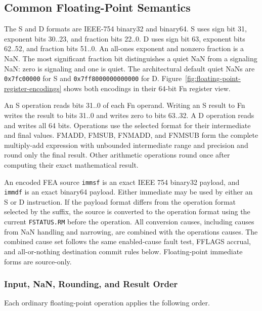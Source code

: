 \subsection{Common Floating-Point Semantics}

The S and D formats are IEEE-754 binary32 and binary64. S uses sign bit 31, exponent bits 30..23, and fraction bits
22..0. D uses sign bit 63, exponent bits 62..52, and fraction bits 51..0. An all-ones exponent and nonzero fraction
is a NaN. The most significant fraction bit distinguishes a quiet NaN from a signaling NaN: zero is signaling and
one is quiet. The architectural default quiet NaNs are \texttt{0x7fc00000} for S and
\texttt{0x7ff8000000000000} for D. Figure~\ref{fig:floating-point-register-encodings} shows both encodings in their
64-bit Fn register view.

An S operation reads bits 31..0 of each Fn operand. Writing an S result to Fn writes the result to bits 31..0 and
writes zero to bits 63..32. A D operation reads and writes all 64 bits. Operations use the selected format for their
intermediate and final values. FMADD, FMSUB, FNMADD, and FNMSUB form the complete multiply-add expression with
unbounded intermediate range and precision and round only the final result. Other arithmetic operations round once
after computing their exact mathematical result.

An encoded FEA source \texttt{immsf} is an exact IEEE 754 binary32 payload, and \texttt{immdf} is an exact
binary64 payload. Either immediate may be used by either an S or D instruction. If the payload format differs from
the operation format selected by the suffix, the source is converted to the operation format using the current
\texttt{FSTATUS.RM} before the operation. All conversion causes, including causes from NaN handling and narrowing,
are combined with the operation\textquotesingle{}s causes. The combined cause set follows the same enabled-cause fault test, FFLAGS
accrual, and all-or-nothing destination commit rules below. Floating-point immediate forms are source-only.

\subsubsection{Input, NaN, Rounding, and Result Order}

Each ordinary floating-point operation applies the following order.

